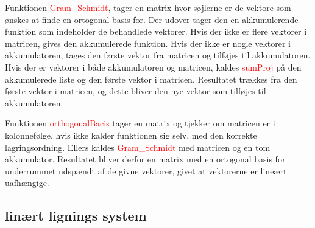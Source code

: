 Funktionen \textcolor{red}{Gram\_Schmidt}, tager en matrix hvor søjlerne er de vektore som ønskes at finde en ortogonal basis for. Der udover tager den en akkumulerende funktion som indeholder de behandlede vektorer. Hvis der ikke er flere vektorer i matricen, gives den akkumulerede funktion. Hvis der ikke er nogle vektorer i akkumulatoren, tages den første vektor fra matricen og tilføjes til akkumulatoren. Hvis der er vektorer i både akkumulatoren og matricen, kaldes \textcolor{red}{sumProj} på den akkumulerede liste og den første vektor i matricen. Resultatet trækkes fra den første vektor i matricen, og dette bliver den nye vektor som tilføjes til akkumulatoren. 

Funktionen \textcolor{red}{orthogonalBacis} tager en matrix og tjekker om matricen er i kolonnefølge, hvis ikke kalder funktionen sig selv, med den korrekte lagringsordning. Ellers kaldes \textcolor{red}{Gram\_Schmidt} med matricen og en tom akkumulator. Resultatet bliver derfor en matrix med en ortogonal basis for underrummet udspændt af de givne vektorer, givet at vektorerne er lineært uafhængige.

\subsection{linært lignings system}\label{sec:lin_eq}
